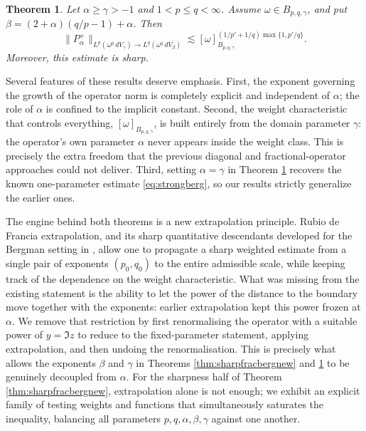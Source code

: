 \documentclass[a4paper,11pt,intlimits,oneside]{amsart}
\newtheorem{theorem}{Theorem}[section]
\theoremstyle{definition}
\numberwithin{equation}{section}
\theoremstyle{definition}
\newcommand{\Be}{\begin{equation}}
\newcommand{\Ee}{\end{equation}}
\begin{document}
\begin{theorem}\label{thm:sharpweakbergnew}
Let $\alpha\geq \gamma>-1$ and $1<p\le q<\infty$. Assume $\omega\in B_{p,q,\gamma}$, and put $\beta=(2+\alpha)(q/p-1) + \alpha$. Then
\Be\label{eq:sharpbergnew}
\| {P}_{\alpha}^+\|_{L^p(\omega^p\,dV_{\gamma})\longrightarrow L^q(\omega^q\,dV_{\beta})}
\lesssim [\omega]_{B_{p,q,\gamma}}^{(1/p'+1/q)\max\{1,p'/q\}}.
\Ee
Moreover, this estimate is sharp.
\end{theorem}

Several features of these results deserve emphasis. First, the exponent governing the growth of the operator norm is completely explicit and independent of $\alpha$; the role of $\alpha$ is confined to the implicit constant. Second, the weight characteristic that controls everything, $[\omega]_{B_{p,q,\gamma}}$, is built entirely from the domain parameter $\gamma$: the operator's own parameter $\alpha$ never appears inside the weight class. This is precisely the extra freedom that the previous diagonal and fractional-operator approaches could not deliver. Third, setting $\alpha=\gamma$ in Theorem \ref{thm:sharpweakbergnew} recovers the known one-parameter estimate \eqref{eq:strongberg}, so our results strictly generalize the earlier ones.

The engine behind both theorems is a new extrapolation principle. Rubio de Francia extrapolation, and its sharp quantitative descendants developed for the Bergman setting in \cite{Laceyetal,Sehba6}, allow one to propagate a sharp weighted estimate from a single pair of exponents $(p_0,q_0)$ to the entire admissible scale, while keeping track of the dependence on the weight characteristic. What was missing from the existing statement is the ability to let the power of the distance to the boundary move together with the exponents: earlier extrapolation kept this power frozen at $\alpha$. We remove that restriction %
by first renormalising the operator with a suitable power of $y=\Im z$ to reduce to the fixed-parameter statement, applying extrapolation, and then undoing the renormalisation. This is precisely what allows the exponents $\beta$ and $\gamma$ in Theorems \ref{thm:sharpfracbergnew} and \ref{thm:sharpweakbergnew} to be genuinely decoupled from $\alpha$. For the sharpness half of Theorem \ref{thm:sharpfracbergnew}, extrapolation alone is not enough; we exhibit an explicit family of testing weights and functions that simultaneously saturates the inequality, balancing all parameters $p,q,\alpha,\beta,\gamma$ against one another.
\end{document}
